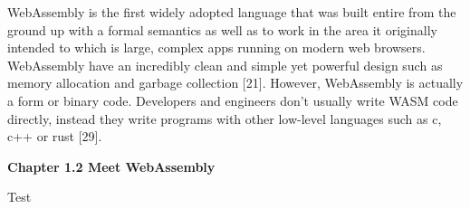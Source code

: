 \bigskip

WebAssembly is the first widely adopted language that was built entire from the ground up with a formal semantics as well as to work in the area it originally intended to which is large, complex apps running on modern web browsers. WebAssembly have an incredibly clean and simple yet powerful design such as memory allocation and garbage collection [21]. However, WebAssembly is actually a form or binary code. Developers and engineers don't usually write WASM code directly, instead they write programs with other low-level languages such as c, c++ or rust [29].

\bigskip
\bigskip

\textbf{{\Large Chapter 1.2 Meet WebAssembly}}

\bigskip

Test